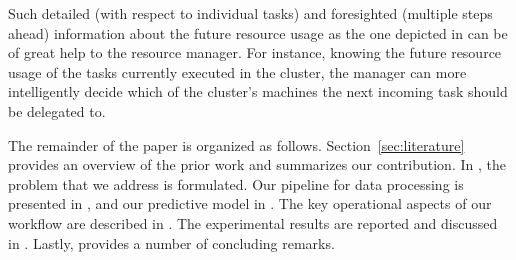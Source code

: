 Such detailed (with respect to individual tasks) and foresighted (multiple steps
ahead) information about the future resource usage as the one depicted in
 can be of great help to the resource manager. For instance,
knowing the future resource usage of the tasks currently executed in the
cluster, the manager can more intelligently decide which of the cluster's
machines the next incoming task should be delegated to.

The remainder of the paper is organized as follows. Section~\ref{sec:literature}
provides an overview of the prior work and summarizes our contribution. In
, the problem that we address is formulated. Our pipeline for data
processing is presented in , and our predictive model in
. The key operational aspects of our workflow are described in
. The experimental results are reported and discussed in
. Lastly,  provides a number of concluding
remarks.
